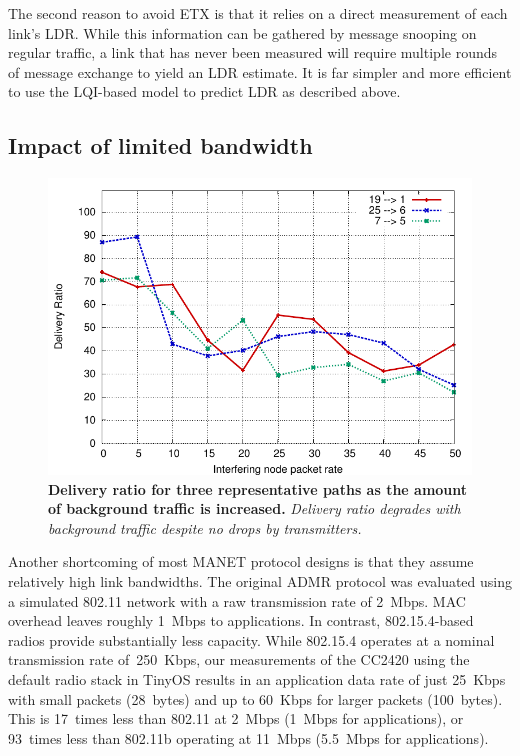 The second reason to avoid ETX is that it relies on a direct
measurement of each link's LDR. While this information can be
gathered by message snooping on regular traffic, a link that 
has never been measured will require multiple rounds of message
exchange to yield an LDR estimate. It is far simpler
and more efficient to use the LQI-based model to predict LDR
as described above.






\subsection{Impact of limited bandwidth}

\begin{figure}[t]
\begin{center}
\includegraphics[width=0.6\hsize]{resources/tinyadmr-techrept05/figures/lessons/lesson4/lesson4.pdf}
\end{center}
\caption{{\small {\bf Delivery ratio for three representative paths as
the amount of background traffic is increased.} {\em
Delivery ratio degrades with background traffic despite no
drops by transmitters.}}}
\label{fig-trl}
\end{figure}

Another shortcoming of most MANET protocol designs is that they assume
relatively high link bandwidths. The original ADMR protocol was
evaluated using a simulated 802.11 network with a raw transmission
rate of 2~Mbps. MAC overhead leaves roughly 1~Mbps to applications. 
In contrast, 802.15.4-based radios provide substantially
less capacity. While 802.15.4 operates at a nominal transmission rate
of~250~Kbps, our measurements of the CC2420 using the default radio
stack in TinyOS results in an application data rate of just 25~Kbps with
small packets (28~bytes) and up to 60~Kbps for larger packets
(100~bytes). This is 17~times less than 802.11 at 2~Mbps (1~Mbps for
applications), or 93~times less than 802.11b operating at 11~Mbps 
(5.5~Mbps for applications).

